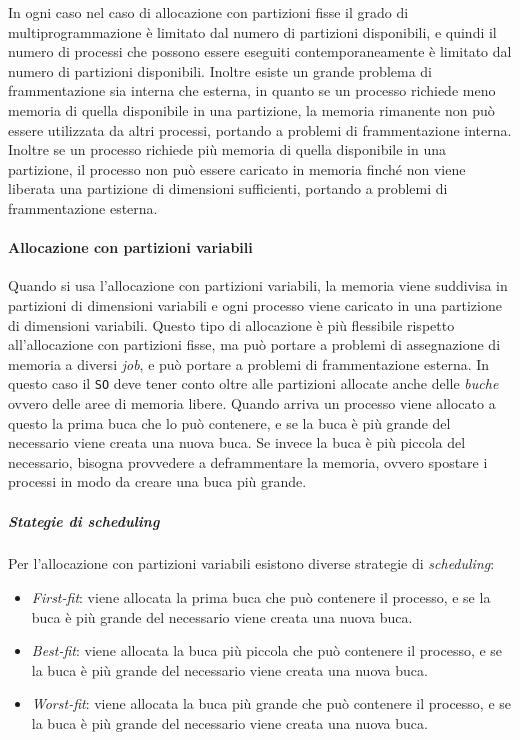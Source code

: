                 In ogni caso nel caso di allocazione con partizioni fisse il grado di multiprogrammazione è limitato dal numero di partizioni disponibili, e quindi il numero di processi che possono essere eseguiti contemporaneamente è limitato dal numero di partizioni disponibili. Inoltre esiste un grande problema di frammentazione sia interna che esterna, in quanto se un processo richiede meno memoria di quella disponibile in una partizione, la memoria rimanente non può essere utilizzata da altri processi, portando a problemi di frammentazione interna. Inoltre se un processo richiede più memoria di quella disponibile in una partizione, il processo non può essere caricato in memoria finché non viene liberata una partizione di dimensioni sufficienti, portando a problemi di frammentazione esterna.
        \paragraph{Allocazione con partizioni variabili}
            Quando si usa l'allocazione con partizioni variabili, la memoria viene suddivisa in partizioni di dimensioni variabili e ogni processo viene caricato in una partizione di dimensioni variabili. Questo tipo di allocazione è più flessibile rispetto all'allocazione con partizioni fisse, ma può portare a problemi di assegnazione di memoria a diversi \textit{job}, e può portare a problemi di frammentazione esterna. \newline
            In questo caso il \texttt{SO} deve tener conto oltre alle partizioni allocate anche delle \textit{buche} ovvero delle aree di memoria libere. Quando arriva un processo viene allocato a questo la prima buca che lo può contenere, e se la buca è più grande del necessario viene creata una nuova buca. Se invece la buca è più piccola del necessario, bisogna provvedere a deframmentare la memoria, ovvero spostare i processi in modo da creare una buca più grande.
            \subparagraph{Stategie di \textit{scheduling}}
                Per l'allocazione con partizioni variabili esistono diverse strategie di \textit{scheduling}:
                \begin{itemize}
                    \item \textit{First-fit}: viene allocata la prima buca che può contenere il processo, e se la buca è più grande del necessario viene creata una nuova buca.
                    \item \textit{Best-fit}: viene allocata la buca più piccola che può contenere il processo, e se la buca è più grande del necessario viene creata una nuova buca.
                    \item \textit{Worst-fit}: viene allocata la buca più grande che può contenere il processo, e se la buca è più grande del necessario viene creata una nuova buca.
                \end{itemize}
